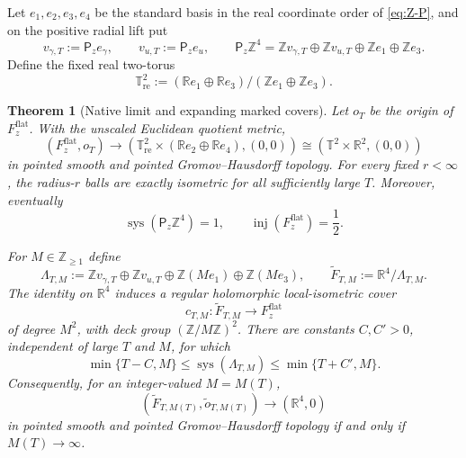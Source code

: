 \documentclass[11pt]{article}
\numberwithin{equation}{section}
\newtheorem{theorem}{Theorem}[section]
\theoremstyle{definition}
\theoremstyle{remark}
\newcommand{\R}{\mathbb R}
\newcommand{\Z}{\mathbb Z}
\newcommand{\T}{\mathbb T}
\begin{document}
Let $e_1,e_2,e_3,e_4$ be the standard basis in the real coordinate order
of \eqref{eq:Z-P}, and on the positive radial lift put
\begin{equation}\label{eq:primal-period-decomposition}
 v_{\gamma,T}:=\mathsf P_ze_\gamma,\qquad
 v_{u,T}:=\mathsf P_ze_u,\qquad
 \mathsf P_z\Z^4
 =\Z v_{\gamma,T}\oplus\Z v_{u,T}
  \oplus\Z e_1\oplus\Z e_3.
\end{equation}
Define the fixed real two-torus
\begin{equation}\label{eq:native-fixed-torus}
 \T^2_{\mathrm{re}}
 :=(\R e_1\oplus\R e_3)/(\Z e_1\oplus\Z e_3).
\end{equation}

\begin{theorem}[Native limit and expanding marked covers]
\label{thm:native-and-cover-limits}
Let $o_T$ be the origin of $F_z^{\mathrm{flat}}$.  With the unscaled
Euclidean quotient metric,
\begin{equation}\label{eq:native-pointed-limit}
 (F_z^{\mathrm{flat}},o_T)
 \longrightarrow
 (\T^2_{\mathrm{re}}\times(\R e_2\oplus\R e_4),(0,0))
 \cong(\T^2\times\R^2,(0,0))
\end{equation}
in pointed smooth and pointed Gromov--Hausdorff topology.  For every fixed
$r<\infty$, the radius-$r$ balls are exactly isometric for all sufficiently
large $T$.  Moreover, eventually
\begin{equation}\label{eq:native-systole}
 \operatorname{sys}(\mathsf P_z\Z^4)=1,
 \qquad \operatorname{inj}(F_z^{\mathrm{flat}})=\frac12.
\end{equation}

For $M\in\Z_{\ge1}$ define
\begin{equation}\label{eq:cover-sublattice}
 \Lambda_{T,M}
 :=\Z v_{\gamma,T}\oplus\Z v_{u,T}
   \oplus\Z(Me_1)\oplus\Z(Me_3),
 \qquad
 \widetilde F_{T,M}:=\R^4/\Lambda_{T,M}.
\end{equation}
The identity on $\R^4$ induces a regular holomorphic local-isometric cover
\begin{equation}\label{eq:degree-cover}
 c_{T,M}:\widetilde F_{T,M}\longrightarrow F_z^{\mathrm{flat}}
\end{equation}
of degree $M^2$, with deck group $(\Z/M\Z)^2$.  There are constants
$C,C'>0$, independent of large $T$ and $M$, for which
\begin{equation}\label{eq:cover-systole-two-sided}
 \min\{T-C,M\}\le\operatorname{sys}(\Lambda_{T,M})
 \le\min\{T+C',M\}.
\end{equation}
Consequently, for an integer-valued $M=M(T)$,
\begin{equation}\label{eq:cover-R4-limit}
 (\widetilde F_{T,M(T)},\widetilde o_{T,M(T)})
 \longrightarrow(\R^4,0)
\end{equation}
in pointed smooth and pointed Gromov--Hausdorff topology if and only if
$M(T)\to\infty$.


\end{theorem}
\end{document}

